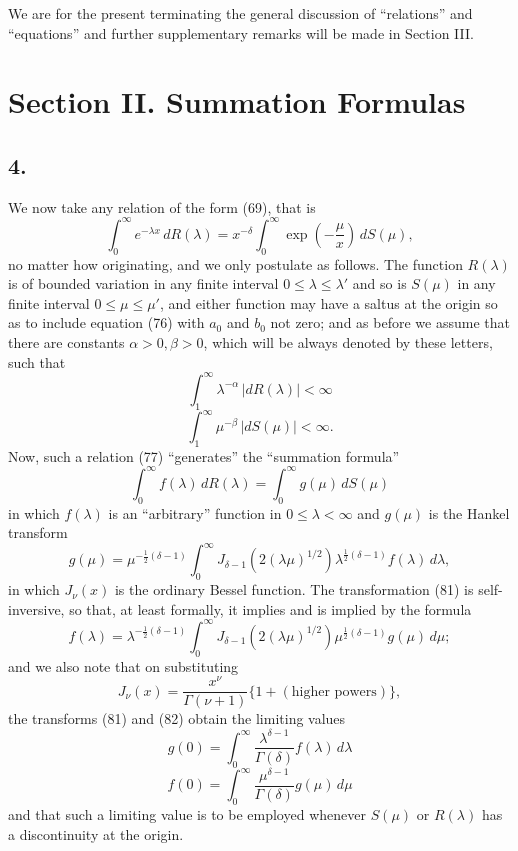 \documentclass[12pt]{article}
\begin{document}
We are for the present terminating the general discussion of ``relations'' and ``equations'' and further supplementary remarks will be made in Section III.

\section*{Section II. Summation Formulas}

\subsection*{4.}

We now take any relation of the form (69), that is
\begin{equation}
\int_0^{\infty} e^{-\lambda x} \, dR(\lambda) = x^{-\delta} \int_0^{\infty} \exp \left( -\frac{\mu}{x} \right) \, dS(\mu),
\tag{77}
\end{equation}
no matter how originating, and we only postulate as follows. The function \(R(\lambda)\) is of bounded variation in any finite interval \(0 \le \lambda \le \lambda'\) and so is \(S(\mu)\) in any finite interval \(0 \le \mu \le \mu'\), and either function may have a saltus at the origin so as to include equation (76) with \(a_0\) and \(b_0\) not zero; and as before we assume that there are constants \(\alpha > 0, \beta > 0\), which will be always denoted by these letters, such that
\begin{equation}
\int_1^{\infty} \lambda^{-\alpha} \, |dR(\lambda)| < \infty
\tag{78}
\end{equation}
\begin{equation}
\int_1^{\infty} \mu^{-\beta} \, |dS(\mu)| < \infty.
\tag{79}
\end{equation}
Now, such a relation (77) ``generates'' the ``summation formula''
\begin{equation}
\int_0^{\infty} f(\lambda) \, dR(\lambda) = \int_0^{\infty} g(\mu) \, dS(\mu)
\tag{80}
\end{equation}
in which \(f(\lambda)\) is an ``arbitrary'' function in \(0 \le \lambda < \infty\) and \(g(\mu)\) is the Hankel transform
\begin{equation}
g(\mu) = \mu^{-\frac{1}{2}(\delta-1)} \int_0^{\infty} J_{\delta-1}(2(\lambda\mu)^{1/2}) \lambda^{\frac{1}{2}(\delta-1)} f(\lambda) \, d\lambda,
\tag{81}
\end{equation}
in which \(J_\nu(x)\) is the ordinary Bessel function. The transformation (81) is self-inversive, so that, at least formally, it implies and is implied by the formula
\begin{equation}
f(\lambda) = \lambda^{-\frac{1}{2}(\delta-1)} \int_0^{\infty} J_{\delta-1}(2(\lambda\mu)^{1/2}) \mu^{\frac{1}{2}(\delta-1)} g(\mu) \, d\mu;
\tag{82}
\end{equation}
and we also note that on substituting
\[
J_\nu(x) = \frac{x^\nu}{\Gamma(\nu + 1)} \{1 + (\text{higher powers})\},
\]
the transforms (81) and (82) obtain the limiting values
\[
g(0) = \int_0^{\infty} \frac{\lambda^{\delta-1}}{\Gamma(\delta)} f(\lambda) \, d\lambda
\]
\[
f(0) = \int_0^{\infty} \frac{\mu^{\delta-1}}{\Gamma(\delta)} g(\mu) \, d\mu
\]
and that such a limiting value is to be employed whenever \(S(\mu)\) or \(R(\lambda)\) has a discontinuity at the origin.
\end{document}
